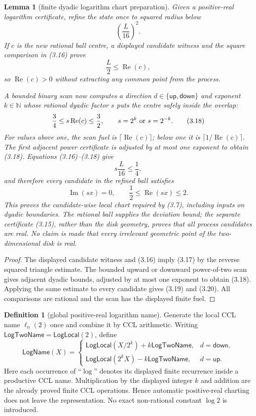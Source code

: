 \documentclass[10pt]{article}
\newtheorem{lemma}[theorem]{Lemma}
\theoremstyle{definition}
\newtheorem{definition}[theorem]{Definition}
\theoremstyle{remark}
\newcommand{\N}{\mathbb{N}}
\newcommand{\Ree}{\operatorname{Re}}
\newcommand{\Imm}{\operatorname{Im}}
\begin{document}
\begin{lemma}[finite dyadic logarithm chart preparation]
Given a positive-real logarithm certificate, refine the state once to
squared radius below
\[
 \left(\frac{L}{16}\right)^2.
 \tag{3.16}
\]
If $c$ is the new rational ball centre, a displayed candidate witness and
the square comparison in (3.16) prove
\[
 \frac L2\le\Ree(c),
 \tag{3.17}
\]
so $\Ree(c)>0$ without extracting any common point from the process.

A bounded binary scan now computes a direction $d\in\{\mathsf{up},
\mathsf{down}\}$ and exponent $k\in\N$ whose rational dyadic factor $s$ puts
the centre safely inside the overlap:
\[
 \frac34\le s\Ree(c)\le\frac32,
 \qquad
 s=2^k\ \hbox{or}\ s=2^{-k}.
 \tag{3.18}
\]
For values above one, the scan fuel is $\lceil\Ree(c)\rceil$; below one it is
$\lceil1/\Ree(c)\rceil$.  The first adjacent power certificate is adjusted
by at most one exponent to obtain (3.18).  Equations (3.16)--(3.18) give
\[
 s\frac{L}{16}\le\frac14,
 \tag{3.19}
\]
and therefore every candidate in the refined ball satisfies
\[
 \Imm(sx)=0,
 \qquad
 \frac12\le\Ree(sx)\le2.
\tag{3.20}
\]
This proves the candidate-wise local chart required by (3.7), including
inputs on dyadic boundaries.  The rational ball supplies the deviation
bound; the separate certificate (3.15), rather than the disk geometry,
proves that all process candidates are real.  No claim is made that every
irrelevant geometric point of the two-dimensional disk is real.
\end{lemma}

\begin{proof}
The displayed candidate witness and (3.16) imply (3.17) by the reverse
squared triangle estimate.  The bounded upward or downward power-of-two scan
gives adjacent dyadic bounds, adjusted by at most one exponent to obtain
(3.18).  Applying the same estimate to every candidate gives (3.19) and
(3.20).  All comparisons are rational and the scan has the displayed finite
fuel.
\end{proof}

\begin{definition}[global positive-real logarithm name]
Generate the local CCL name
$\ell_n(2)$ once and combine it by CCL arithmetic.  Writing
$\mathsf{LogTwoName}=\mathsf{LogLocal}(2)$, define
\[
 \mathsf{LogName}(X)=
 \begin{cases}
   \mathsf{LogLocal}(X/2^k)+k\mathsf{LogTwoName},
      &d=\mathsf{down},\\
   \mathsf{LogLocal}(2^kX)-k\mathsf{LogTwoName},
      &d=\mathsf{up}.
 \end{cases}
\tag{3.21}
\]
Here each occurrence of ``$\log$'' denotes its displayed finite recurrence
inside a productive CCL name.  Multiplication by the displayed integer $k$
and addition are the already proved finite CCL operations.  Hence automatic
positive-real charting does not leave the representation.  No exact
non-rational constant $\log2$ is introduced.
\end{definition}
\end{document}
